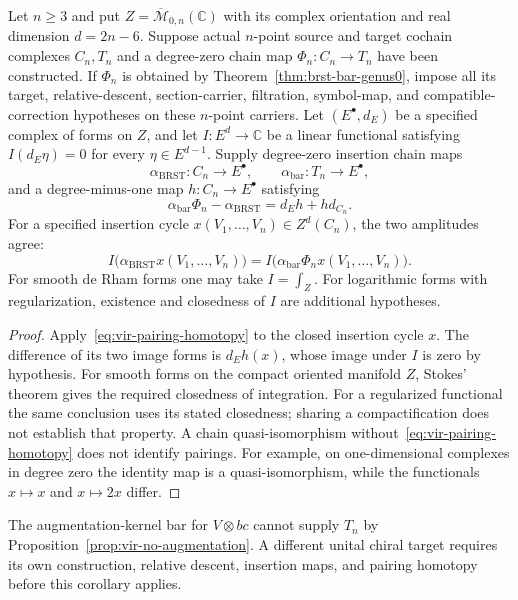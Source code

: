 \begin{corollary}\label{cor:string-amplitude-genus0}
Let $n\geq3$ and put $Z=\overline{\mathcal M}_{0,n}(\mathbb C)$ with its complex orientation and real dimension $d=2n-6$.
Suppose actual $n$-point source and target cochain complexes $C_n,T_n$ and a degree-zero chain map $\Phi_n:C_n\to T_n$ have been constructed.
If $\Phi_n$ is obtained by Theorem~\ref{thm:brst-bar-genus0}, impose all its target, relative-descent, section-carrier, filtration, symbol-map, and compatible-correction hypotheses on these $n$-point carriers.
Let $(E^\bullet,d_E)$ be a specified complex of forms on $Z$, and let
$I:E^d\to\mathbb C$ be a linear functional satisfying $I(d_E\eta)=0$ for every $\eta\in E^{d-1}$.
Supply degree-zero insertion chain maps
\[
 \alpha_{\mathrm{BRST}}:C_n\to E^\bullet,
 \qquad \alpha_{\mathrm{bar}}:T_n\to E^\bullet,
\]
and a degree-minus-one map $h:C_n\to E^\bullet$ satisfying
\begin{equation}\label{eq:vir-pairing-homotopy}
 \alpha_{\mathrm{bar}}\Phi_n-\alpha_{\mathrm{BRST}}
 =d_Eh+h d_{C_n}.
\end{equation}
For a specified insertion cycle $x(V_1,\ldots,V_n)\in Z^d(C_n)$, the two amplitudes agree:
\[
 I\bigl(\alpha_{\mathrm{BRST}}x(V_1,\ldots,V_n)\bigr)
 =I\bigl(\alpha_{\mathrm{bar}}\Phi_nx(V_1,\ldots,V_n)\bigr).
\]
For smooth de Rham forms one may take $I=\int_Z$.
For logarithmic forms with regularization, existence and closedness of $I$ are additional hypotheses.
\end{corollary}

\begin{proof}
Apply~\eqref{eq:vir-pairing-homotopy} to the closed insertion cycle $x$.
The difference of its two image forms is $d_Eh(x)$, whose image under $I$ is zero by hypothesis.
For smooth forms on the compact oriented manifold $Z$, Stokes' theorem gives the required closedness of integration.
For a regularized functional the same conclusion uses its stated closedness; sharing a compactification does not establish that property.
A chain quasi-isomorphism without~\eqref{eq:vir-pairing-homotopy} does not identify pairings.
For example, on one-dimensional complexes in degree zero the identity map is a quasi-isomorphism, while the functionals $x\mapsto x$ and $x\mapsto2x$ differ.
\end{proof}

The augmentation-kernel bar for $V\otimes bc$ cannot supply $T_n$ by Proposition~\ref{prop:vir-no-augmentation}.
A different unital chiral target requires its own construction, relative descent, insertion maps, and pairing homotopy before this corollary applies.

